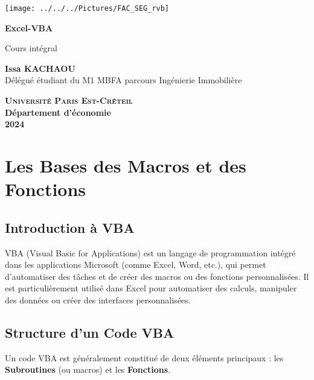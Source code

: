 \documentclass[a4paper,12pt]{report}
\begin{document}
	
	
	\begin{titlepage}
		\centering
		\begin{center}
\texttt{[image: ../../../Pictures/FAC\_SEG\_rvb]}
					
		\end{center}
		\vspace*{2cm}
		\Huge
		
		\textbf{Excel-VBA}
		\vspace{1.5cm}
		
		\Large
		Cours intégral
		
		\vspace{2cm}
		
		\textbf{Issa KACHAOU} \\
		{\normalsize Délégué étudiant du M1 MBFA parcours Ingénierie Immobilière}
		
		
		\vfill
		
		\Large
		
		\textsc{\textbf{Université Paris Est-Créteil}}	 \\
		\textbf{Département d'économie} \\
		\textbf{2024}
		
	\end{titlepage}
	\thispagestyle{empty}
	\newpage
	\clearpage
	\mbox{}
	\thispagestyle{empty}
	
	\tableofcontents
	
	\thispagestyle{empty}
	\newpage
	\mbox{}
	\thispagestyle{empty} %
	
\chapter{Les Bases des Macros et des Fonctions}
	
	\section{Introduction à VBA}
	VBA (Visual Basic for Applications) est un langage de programmation intégré dans les applications Microsoft (comme Excel, Word, etc.), qui permet d'automatiser des tâches et de créer des macros ou des fonctions personnalisées. Il est particulièrement utilisé dans Excel pour automatiser des calculs, manipuler des données ou créer des interfaces personnalisées.
	
	\section{Structure d'un Code VBA}
	Un code VBA est généralement constitué de deux éléments principaux : les \textbf{Subroutines} (ou macros) et les \textbf{Fonctions}.
	
\end{document}
